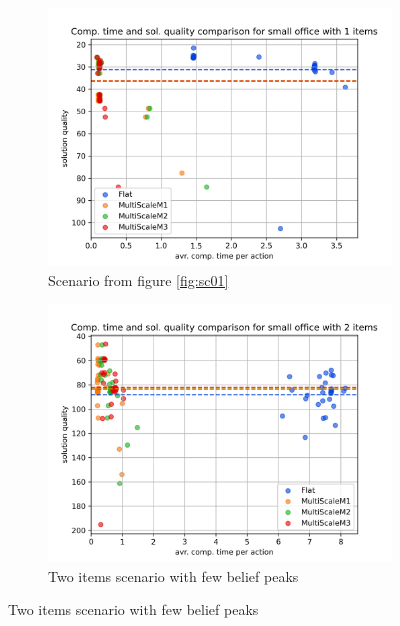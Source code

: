 \begin{figure}
    \centering
    \begin{subfigure}[b]{0.49\textwidth}
        \includegraphics[width=\textwidth]{Report/images/comp_time_vs_sol_quality/envsmall_sc01_scatter_comptimes_vs_solqual.png}
        \caption{Scenario from figure \ref{fig:sc01}}
        \label{subfig:comp_sc01}
    \end{subfigure}
    \begin{subfigure}[b]{0.49\textwidth}
         \includegraphics[width=\textwidth]{Report/images/comp_time_vs_sol_quality/envsmall_sc04_scatter_comptimes_vs_solqual.png}
        \caption{Two items scenario with few belief peaks}
        \label{subfig:comp_sc04}
    \end{subfigure}

\end{figure}

